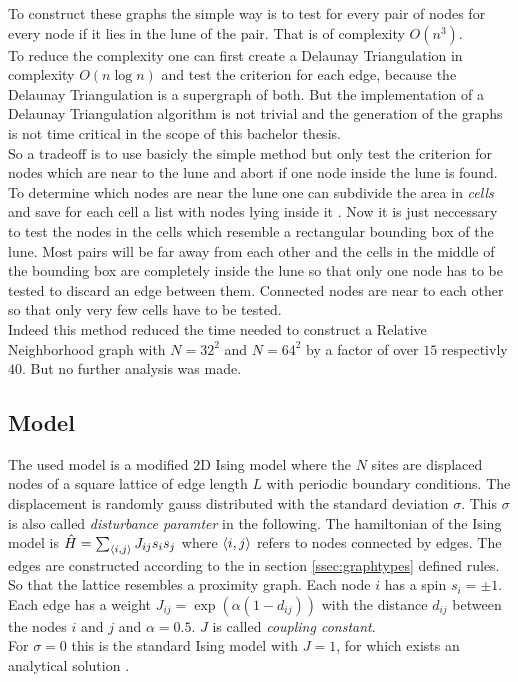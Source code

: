     To construct these graphs the simple way is to test for every
    pair of nodes for every node if it lies in the lune of the pair.
    That is of complexity \(O (n^3)\).\\
    To reduce the complexity one can first create a Delaunay
    Triangulation in complexity \(O (n \log n)\)
    \cite{Leach1992} and test the criterion for each edge, because
    the Delaunay Triangulation is a supergraph of both. But the
    implementation of a Delaunay Triangulation algorithm is not
    trivial and the generation of the graphs is not time critical in
    the scope of this bachelor thesis.\\
    So a tradeoff is to use basicly the simple method but only test
    the criterion for nodes which are near to the lune and abort if
    one node inside the lune is found. To determine which nodes are
    near the lune one can subdivide the area in \emph{cells} and save
    for each cell a list with nodes lying inside it \cite{RNGCell}.
    Now it is just neccessary to test the nodes in the cells which
    resemble a rectangular bounding box of the lune. Most pairs will be
    far away from each other and the cells in the middle of the bounding
    box are completely inside the lune so that only one node has to be
    tested to discard an edge between them. Connected nodes are near to
    each other so that only very few cells have to be tested.\\
    Indeed this method reduced the time needed to construct a Relative
    Neighborhood graph with \(N=32^2\) and \(N=64^2\) by a factor of
    over \(15\) respectivly \(40\). But no further analysis was made.

\subsection{Model}
\label{ssec:isingmodel}
    The used model is a modified 2D Ising model where the \(N\) sites
    are displaced nodes of a square lattice of edge length \(L\) with
    periodic boundary conditions. The displacement is randomly gauss
    distributed with the standard deviation \(\sigma\). This \(\sigma\)
    is also called \emph{disturbance paramter} in the following.
    The hamiltonian of the Ising model is
    \(\hat{H} = \sum_{\left< i,j \right>}J_{ij}s_{i}s_{j}\)
    where \(\left< i,j \right>\) refers to nodes connected  by edges.
    The edges are constructed according to the in section
    \ref{ssec:graphtypes} defined rules. So that the lattice resembles a
    proximity graph. Each node \(i\) has a spin \(s_i = \pm 1\). Each
    edge has a weight \(J_{ij} = \exp (\alpha (1-d_{ij}))\) with the
    distance \(d_{ij}\) between the nodes \(i\) and \(j\) and
    \(\alpha = 0.5\). \(J\) is called \emph{coupling constant}.\\
    For \(\sigma = 0\) this is the standard Ising model with \(J = 1\),
    for which exists an analytical solution \cite{Onsager1944}.\\

